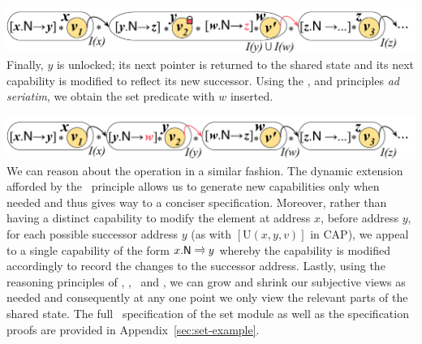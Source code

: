 %
{\centering \includegraphics[scale=0.25]{Sections/Examples/Images/add2.pdf}\\}
%
\noindent Finally, $y$ is unlocked; its next pointer is returned to the shared state and its next capability is modified to reflect its new successor. Using the \copyRule, \forgetRule and \shiftRule principles \textit{ad seriatim}, we obtain the set predicate with $w$ inserted. 

%
{\centering \includegraphics[scale=0.25]{Sections/Examples/Images/add3.pdf}\\}
%
We can reason about the  operation in a similar fashion. The dynamic extension afforded by the \extendRule\ principle allows us to generate new capabilities only when needed and thus gives way to a conciser specification. 
%
Moreover, rather than having a distinct capability to modify the element at address $x$, before address $y$, for each possible successor address $y$ (as with $[\text{U}(x, y, v)]$ in CAP), we appeal to a single capability of the form $\nextC{x}{y}$ whereby the capability is modified accordingly to record the changes to the successor address. 
%
Lastly, using the reasoning principles of \mergeRule, \forgetRule, \shiftRule\ and \copyRule, we can grow and shrink our subjective views as needed and consequently at any one point we only view the relevant parts of the shared state. 
%
The full \colosl\ specification of the set module as well as the specification proofs are provided in Appendix~\ref{sec:set-example}.

